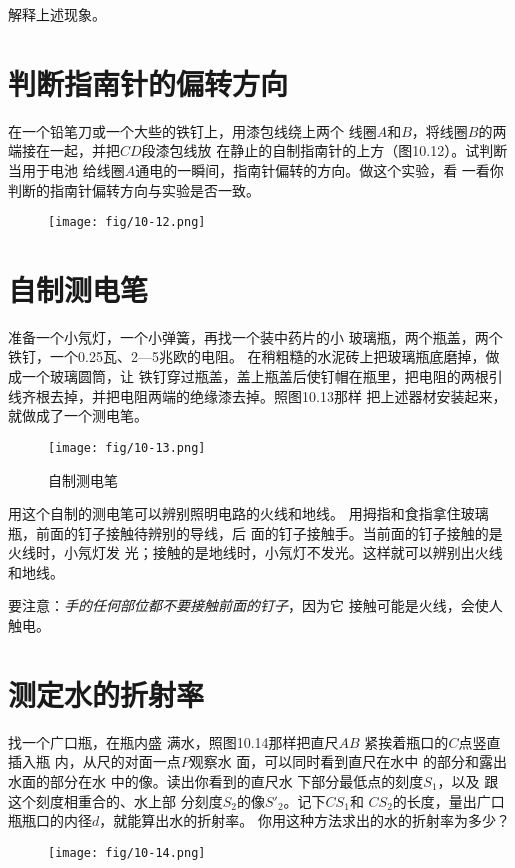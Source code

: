 解释上述现象。

\section{判断指南针的偏转方向}
在一个铅笔刀或一个大些的铁钉上，用漆包线绕上两个
线圈$A$和$B$，将线圈$B$的两端接在一起，并把$CD$段漆包线放
在静止的自制指南针的上方（图10.12）。试判断当用于电池
给线圈$A$通电的一瞬间，指南针偏转的方向。做这个实验，看
一看你判断的指南针偏转方向与实验是否一致。
\begin{figure}[htp]\centering
    \texttt{[image: fig/10-12.png]}
    \caption{}
    \end{figure}

\section{自制测电笔}
准备一个小氖灯，一个小弹簧，再找一个装中药片的小
玻璃瓶，两个瓶盖，两个铁钉，一个0.25瓦、2—5兆欧的电阻。
在稍粗糙的水泥砖上把玻璃瓶底磨掉，做成一个玻璃圆筒，让
铁钉穿过瓶盖，盖上瓶盖后使钉帽在瓶里，把电阻的两根引
线齐根去掉，并把电阻两端的绝缘漆去掉。照图10.13那样
把上述器材安装起来，就做成了一个测电笔。
\begin{figure}[htp]\centering
    \texttt{[image: fig/10-13.png]}
    \caption{自制测电笔}
    \end{figure}

用这个自制的测电笔可以辨别照明电路的火线和地线。
用拇指和食指拿住玻璃瓶，前面的钉子接触待辨别的导线，后
面的钉子接触手。当前面的钉子接触的是火线时，小氖灯发
光；接触的是地线时，小氖灯不发光。这样就可以辨别出火线
和地线。

要注意：\textit{手的任何部位都不要接触前面的钉子}，因为它
接触可能是火线，会使人触电。

\section{测定水的折射率}
找一个广口瓶，在瓶内盛
满水，照图10.14那样把直尺$AB$
紧挨着瓶口的$C$点竖直插入瓶
内，从尺的对面一点$P$观察水
面，可以同时看到直尺在水中
的部分和露出水面的部分在水
中的像。读出你看到的直尺水
下部分最低点的刻度$S_1$，以及
跟这个刻度相重合的、水上部
分刻度$S_2$的像$S'_2$。记下$CS_1$和
$CS_2$的长度，量出广口瓶瓶口的内径$d$，就能算出水的折射率。
你用这种方法求出的水的折射率为多少？
\begin{figure}[htp]\centering
    \texttt{[image: fig/10-14.png]}
    \caption{}
    \end{figure}

